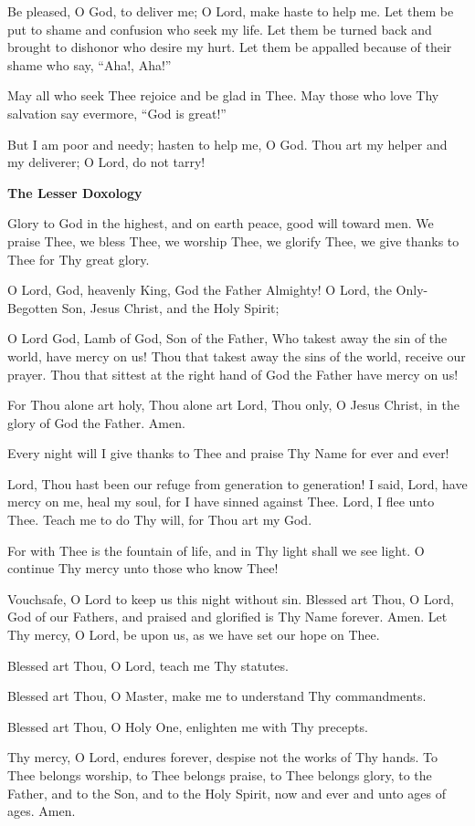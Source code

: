 \documentclass[paper=a6,fontsize=2.3mm]{scrartcl}
\begin{document}
\noindent\makebox[10mm][l]{}
\begin{minipage}[t]{\dimexpr \textwidth-10mm}
Be pleased, O God, to deliver me; O Lord, make haste to help me.  Let them be put to shame and confusion who seek my life.  Let them be turned back and brought to dishonor who desire my hurt.  Let them be appalled because of their shame who say, ``Aha!, Aha!''

May all who seek Thee rejoice and be glad in Thee.  May those who love Thy salvation say evermore, ``God is great!''

But I am poor and needy; hasten to help me, O God.  Thou art my helper and my deliverer; O Lord, do not tarry!
\end{minipage}

\newpage
\begin{center}
\textbf{The Lesser Doxology}
\end{center}

\noindent{}
\begin{minipage}[t]{\dimexpr \textwidth-10mm}
Glory to God in the highest, and on earth peace, good will toward men.
We praise Thee, we bless Thee, we worship Thee, we glorify Thee, we give thanks 
to Thee for Thy great glory.

O Lord, God, heavenly King, God the Father Almighty! O Lord, the Only-Begotten Son, Jesus Christ, and the Holy Spirit;

O Lord God, Lamb of God, Son of the Father, Who takest away the sin of the world, have mercy on us!  Thou that takest away the sins of the world, receive our prayer.  Thou that sittest at the right hand of God the Father have mercy on us!

For Thou alone art holy, Thou alone art Lord, Thou only, O Jesus Christ, in the glory of God the Father.  Amen.

Every night will I give thanks to Thee and praise Thy Name for ever and ever!

Lord, Thou hast been our refuge from generation to generation!  I said, Lord, have mercy on me, heal my soul, for I have sinned against Thee.  Lord, I flee unto Thee.  Teach me to do Thy will, for Thou art my God.

For with Thee is the fountain of life, and in Thy light shall we see light.  O continue Thy mercy unto those who know Thee!

Vouchsafe, O Lord to keep us this night without sin.  Blessed art Thou, O Lord, God of our Fathers, and praised and glorified is Thy Name forever.  Amen.  Let Thy mercy, O Lord, be upon us, as we have set our hope on Thee.

Blessed art Thou, O Lord, teach me Thy statutes.

Blessed art Thou, O Master, make me to understand Thy commandments.

Blessed art Thou, O Holy One, enlighten me with Thy precepts.

Thy mercy, O Lord, endures forever, despise not the works of Thy hands. To Thee belongs worship, to Thee belongs praise, to Thee belongs glory, to the Father, and to the Son, and to the Holy Spirit, now and ever and unto ages of ages. Amen.
\end{minipage}
\end{document}
